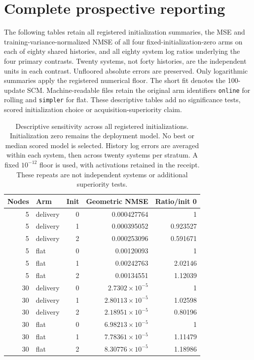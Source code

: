 \section{Complete prospective reporting}
\label{app:prospective-complete}
The following tables retain all registered initialization summaries, the MSE
and training-variance-normalized NMSE of all four fixed-initialization-zero
arms on each of eighty shared histories, and all eighty system log ratios
underlying the four primary contrasts. Twenty systems, not forty histories,
are the independent units in each contrast. Unfloored absolute errors are
preserved. Only logarithmic summaries apply the registered numerical floor.
The short fit denotes the 100-update SCM. Machine-readable files retain the
original arm identifiers \texttt{online} for rolling and \texttt{simpler} for flat. These descriptive tables add no significance tests, scored
initialization choice or acquisition-superiority claim.
\makeatletter
\setlength{\@fptop}{0pt}
\setlength{\@fpsep}{20pt}
\setlength{\@fpbot}{0pt plus 1fil}
\makeatother
\begin{table}[ht]
\centering\small
\begin{tabular}{rlrrr}
\toprule
Nodes & Arm & Init & Geometric NMSE & Ratio/init 0\\
\midrule
5 & delivery & 0 & 0.000427764 & 1\\
5 & delivery & 1 & 0.000395052 & 0.923527\\
5 & delivery & 2 & 0.000253096 & 0.591671\\
5 & flat & 0 & 0.00120093 & 1\\
5 & flat & 1 & 0.00242763 & 2.02146\\
5 & flat & 2 & 0.00134551 & 1.12039\\
30 & delivery & 0 & $2.7302\times10^{-5}$ & 1\\
30 & delivery & 1 & $2.80113\times10^{-5}$ & 1.02598\\
30 & delivery & 2 & $2.18951\times10^{-5}$ & 0.80196\\
30 & flat & 0 & $6.98213\times10^{-5}$ & 1\\
30 & flat & 1 & $7.78361\times10^{-5}$ & 1.11479\\
30 & flat & 2 & $8.30776\times10^{-5}$ & 1.18986\\
\bottomrule
\end{tabular}
\caption{Descriptive sensitivity across all registered initializations. Initialization zero remains the deployment model. No best or median scored model is selected. History log errors are averaged within each system, then across twenty systems per stratum. A fixed $10^{-12}$ floor is used, with activations retained in the receipt. These repeats are not independent systems or additional superiority tests.}
\label{tab:prospective-init}
\end{table}

